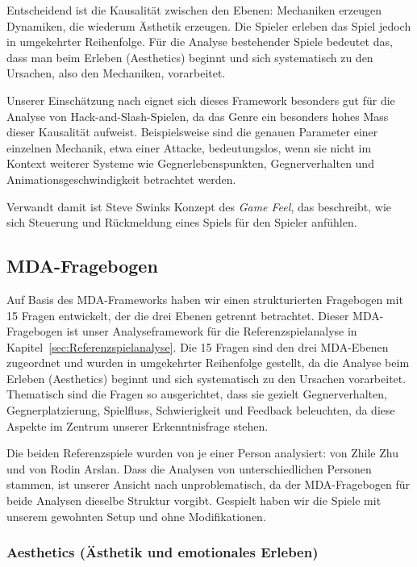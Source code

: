 \documentclass[../Main.tex]{subfiles}
\begin{document}
Entscheidend ist die Kausalität zwischen den Ebenen: Mechaniken erzeugen Dynamiken, die wiederum Ästhetik erzeugen. Die Spieler erleben das Spiel jedoch in umgekehrter Reihenfolge.\autocite[\textcolor{red}{S.~??}]{hunicke2004mda} Für die Analyse bestehender Spiele bedeutet das, dass man beim Erleben (Aesthetics) beginnt und sich systematisch zu den Ursachen, also den Mechaniken, vorarbeitet.

Unserer Einschätzung nach eignet sich dieses Framework besonders gut für die Analyse von Hack-and-Slash-Spielen, da das Genre ein besonders hohes Mass dieser Kausalität aufweist. Beispielsweise sind die genauen Parameter einer einzelnen Mechanik, etwa einer Attacke, bedeutungslos, wenn sie nicht im Kontext weiterer Systeme wie Gegnerlebenspunkten, Gegnerverhalten und Animationsgeschwindigkeit betrachtet werden.

Verwandt damit ist Steve Swinks Konzept des \textit{Game Feel}, das beschreibt, wie sich Steuerung und Rückmeldung eines Spiels für den Spieler anfühlen.\autocite[1--6]{swink2008gamefeel}

\subsection{MDA-Fragebogen} \label{sec:Analysefragebogen}

Auf Basis des MDA-Frameworks haben wir einen strukturierten Fragebogen mit 15 Fragen entwickelt, der die drei Ebenen getrennt betrachtet. Dieser MDA-Fragebogen ist unser Analyseframework für die Referenzspielanalyse in Kapitel~\ref{sec:Referenzspielanalyse}. Die 15 Fragen sind den drei MDA-Ebenen zugeordnet und wurden in umgekehrter Reihenfolge gestellt, da die Analyse beim Erleben (Aesthetics) beginnt und sich systematisch zu den Ursachen vorarbeitet. Thematisch sind die Fragen so ausgerichtet, dass sie gezielt Gegnerverhalten, Gegnerplatzierung, Spielfluss, Schwierigkeit und Feedback beleuchten, da diese Aspekte im Zentrum unserer Erkenntnisfrage stehen.

Die beiden Referenzspiele wurden von je einer Person analysiert:  von Zhile Zhu und  von Rodin Arslan. Dass die Analysen von unterschiedlichen Personen stammen, ist unserer Ansicht nach unproblematisch, da der MDA-Fragebogen für beide Analysen dieselbe Struktur vorgibt. Gespielt haben wir die Spiele mit unserem gewohnten Setup und ohne Modifikationen.

\subsubsection{Aesthetics (Ästhetik und emotionales Erleben)}
\end{document}
